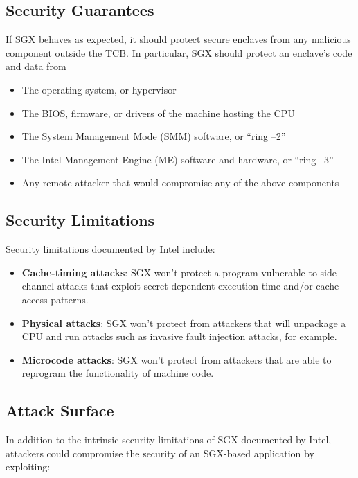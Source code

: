 \documentclass[]{article}
\begin{document}
\subsection{Security Guarantees}\label{security-guarantees}

If SGX behaves as expected, it should protect secure enclaves from any
malicious component outside the TCB. In particular, SGX should protect
an enclave's code and data from

\begin{itemize}
\item
  The operating system, or hypervisor
\item
  The BIOS, firmware, or drivers of the machine hosting the CPU
\item
  The System Management Mode (SMM) software, or ``ring --2''
\item
  The Intel Management Engine (ME) software and hardware, or ``ring
  --3''
\item
  Any remote attacker that would compromise any of the above components
\end{itemize}

\subsection{Security Limitations}\label{security-limitations}

Security limitations documented by Intel include:

\begin{itemize}
\item
  \textbf{Cache-timing attacks}: SGX won't protect a program vulnerable
  to side-channel attacks that exploit secret-dependent execution time
  and/or cache access patterns.
\item
  \textbf{Physical attacks}: SGX won't protect from attackers that will
  unpackage a CPU and run attacks such as invasive fault injection
  attacks, for example.
\item
  \textbf{Microcode attacks}: SGX won't protect from attackers that are
  able to reprogram the functionality of machine code.
\end{itemize}

\subsection{Attack Surface}\label{attack-surface}

In addition to the intrinsic security limitations of SGX documented by
Intel, attackers could compromise the security of an SGX-based
application by exploiting:
\end{document}

